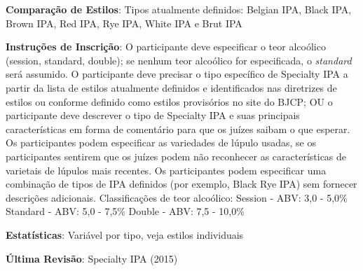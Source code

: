 \textbf{Comparação de Estilos}: Tipos atualmente definidos: Belgian IPA, Black IPA, Brown IPA, Red IPA, Rye IPA, White IPA e Brut IPA

\textbf{Instruções de Inscrição}: O participante deve especificar o teor alcoólico (session, standard, double); se nenhum teor alcoólico for especificada, o \textit{standard} será assumido. O participante deve precisar o tipo específico de Specialty IPA a partir da lista de estilos atualmente definidos e identificados nas diretrizes de estilos ou conforme definido como estilos provisórios no site do BJCP; OU o participante deve descrever o tipo de Specialty IPA e suas principais características em forma de comentário para que os juízes saibam o que esperar. Os participantes podem especificar as variedades de lúpulo usadas, se os participantes sentirem que os juízes podem não reconhecer as características de varietais de lúpulos mais recentes. Os participantes podem especificar uma combinação de tipos de IPA definidos (por exemplo, Black Rye IPA) sem fornecer descrições adicionais. Classificações de teor alcoólico: Session - ABV: 3,0 - 5,0\% Standard - ABV: 5,0 - 7,5\% Double - ABV: 7,5 - 10,0\%

\textbf{Estatísticas}: Variável por tipo, veja estilos individuais

\textbf{Última Revisão}: Specialty IPA (2015)

